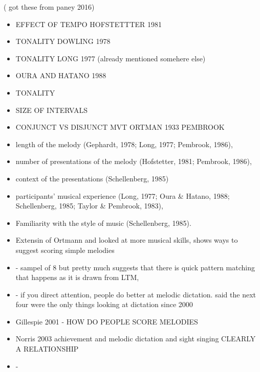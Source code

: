 \documentclass[]{book}
\theoremstyle{definition}
\theoremstyle{definition}
\theoremstyle{definition}
\theoremstyle{remark}
\begin{document}
( got these from paney 2016)

\begin{itemize}
\item
  EFFECT OF TEMPO HOFSTETTTER 1981
\item
  TONALITY DOWLING 1978
\item
  TONALITY LONG 1977 (already mentioned somehere else)
\item
  OURA AND HATANO 1988
\item
  TONALITY \citep{pembrookInterferenceTranscriptionProcess1986}
\item
  SIZE OF INTERVALS \citep{ortmannTonalDeterminantsMelodic1933}
\item
  CONJUNCT VS DISJUNCT MVT ORTMAN 1933 PEMBROOK
\item
  length of the melody (Gephardt, 1978; Long, 1977; Pembrook, 1986),
\item
  number of presentations of the melody (Hofstetter, 1981; Pembrook,
  1986),
\item
  context of the presentations (Schellenberg, 1985)
\item
  participants' musical experience (Long, 1977; Oura \& Hatano, 1988;
  Schellenberg, 1985; Taylor \& Pembrook, 1983),
\item
  Familiarity with the style of music (Schellenberg, 1985).
\item
  \citep{taylorStrategiesMemoryShort1983} Extensin of Ortmann and looked
  at more musical skills, shows ways to suggest scoring simple melodies
\item
  \citep{ouraConstructingRepresentationMelody1991a} - sampel of 8 but
  pretty much suggests that there is quick pattern matching that happens
  as it is drawn from LTM,
\item
  \citep{paneyEffectDirectingAttention2016} - if you direct attention,
  people do better at melodic dictation. said the next four were the
  only things looking at dictation since 2000
\item
  Gillespie 2001 - HOW DO PEOPLE SCORE MELODIES
\item
  Norris 2003 achievement and melodic dictation and sight singing
  CLEARLY A RELATIONSHIP
\item
  \citep{pembrookSendHelpAural1990} -


\end{itemize}
\end{document}
